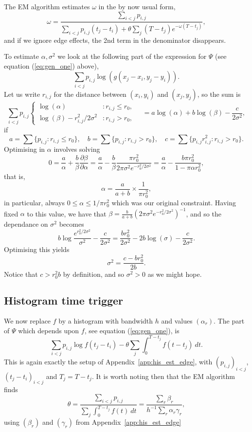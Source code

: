 \documentclass[twoside,a4paper]{article}
\theoremstyle{plain}
\theoremstyle{definition}
\begin{document}
The EM algorithm estimates $\omega$ in the by now usual form,
\[ \omega = \frac{\sum_{i<j} p_{i,j}}{\sum_{i<j} p_{i,j} (t_j-t_i) +
\theta \sum_j (T-t_j) e^{-\omega(T-t_j)}}, \]
and if we ignore edge effects, the 2nd term in the denominator disappears.

To estimate $\alpha,\sigma^2$ we look at the following part of the expression for $\Psi$
(see equation (\ref{eq:gen_one}) above),
\[ \sum_{i<j} p_{i,j} \log(g(x_j-x_i, y_j-y_i)). \]
Let us write $r_{i,j}$ for the distance between $(x_i,y_i)$ and $(x_j,y_j)$, so the sum is
\[ \sum_{i<j} p_{i,j} \begin{cases} \log(\alpha) &: r_{i,j}\leq r_0, \\
\log(\beta) - r_{i,j}^2/2\sigma^2 &: r_{i,j} > r_0, \end{cases}
\quad = a\log(\alpha) + b\log(\beta) - \frac{c}{2\sigma^2}, \]
if
\[ a = \sum \big\{ p_{i,j} : r_{i,j}\leq r_0 \big\}, \quad
b = \sum \big\{ p_{i,j} : r_{i,j} > r_0 \big\}, \quad
c = \sum \big\{ p_{i,j}r_{i,j}^2 : r_{i,j} > r_0 \big\}. \]
Optimising in $\alpha$ involves solving
\[ 0 = \frac{a}{\alpha} + \frac{b}{\beta} \frac{\partial \beta}{\partial \alpha}
= \frac{a}{\alpha} - \frac{b}{\beta} \frac{\pi r_0^2}{2\pi\sigma^2 e^{-r_0^2/2\sigma^2}}
= \frac{a}{\alpha} - \frac{b\pi r_0^2}{1-\pi\alpha r_0^2}, \]
that is,
\[ \alpha = \frac{a}{a+b} \times \frac{1}{\pi r_0^2}, \]
in particular, always $0 \leq \alpha \leq 1 / \pi r_0^2$ which was our original constraint.
Having fixed $\alpha$ to this value, we have that $\beta = \frac{b}{a+b}
(2\pi\sigma^2e^{-r_0^2/2\sigma^2})^{-1}$, and so the dependance on $\sigma^2$ becomes
\[ b \log\frac{e^{r_0^2/2\sigma^2}}{\sigma^2} - \frac{c}{2\sigma^2}
= \frac{b r_0^2}{2\sigma^2} - 2b\log(\sigma) - \frac{c}{2\sigma^2}. \]
Optimising this yields
\[ \sigma^2 = \frac{c - br_0^2}{2b}. \]
Notice that $c > r_0^2 b$ by definition, and so $\sigma^2>0$ as we might hope.


\subsection{Histogram time trigger}\label{app:grid_space_hist_time}

We now replace $f$ by a histogram with bandwidth $h$ and values $(\alpha_r)$.
The part of $\Psi$ which depends upon $f$, see equation (\ref{eq:gen_one}), is
\[ \sum_{i<j} p_{i,j} \log f(t_j-t_i) - \theta \sum_j \int_0^{T-t_j} f(t-t_j) \ dt. \]
This is again exactly the setup of Appendix~\ref{app:his_est_edge}, with $(p_{i,j})_{i<j}$,
$(t_j-t_i)_{i<j}$ and $T_j = T-t_j$.  It is worth noting then that the EM algorithm finds
\[ \theta = \frac{\sum_{i<j} p_{i,j}}{\sum_j \int_0^{T-t_j} f(t) \ dt}
= \frac{\sum_r \beta_r}{h^{-1} \sum_r \alpha_r \gamma_r}, \]
using $(\beta_r)$ and $(\gamma_r)$ from Appendix~\ref{app:his_est_edge}
\end{document}
